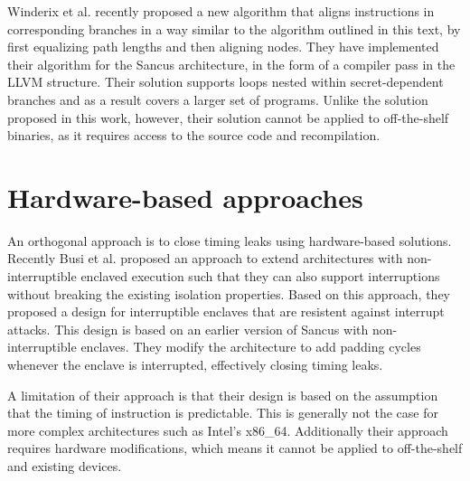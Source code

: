 Winderix et al. \cite{WinderixHans} recently proposed a new algorithm that aligns instructions in corresponding branches in a way similar to the algorithm outlined in this text, 
by first equalizing path lengths and then aligning nodes. 
They have implemented their algorithm for the Sancus architecture, in the form of a compiler pass in the LLVM structure. Their solution supports loops nested within secret-dependent branches 
and as a result covers a larger set of programs. Unlike the solution proposed in this work, however, their solution cannot be applied to off-the-shelf binaries, as it requires access to the source code and recompilation.  
 
\section{Hardware-based approaches}
\label{sec:hardware}

An orthogonal approach is to close timing leaks using hardware-based solutions. 
Recently Busi et al. \cite{busi} proposed an approach to extend architectures with non-interruptible enclaved execution such that they can also support interruptions without breaking 
the existing isolation properties. Based on this approach, they proposed  a design for interruptible enclaves that are resistent against interrupt attacks. 
This design is based on an earlier version of Sancus with non-interruptible enclaves. They modify the architecture to add padding cycles whenever the enclave is interrupted, effectively closing timing leaks. 

A limitation of their approach is that their design is based on the assumption that the timing of instruction is predictable. This is generally not the case for more complex architectures such as Intel's x86\_64.
Additionally their approach requires hardware modifications, which means it cannot be applied to off-the-shelf and existing devices. 

